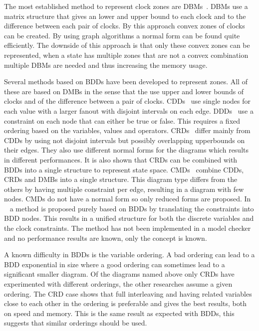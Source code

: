 \documentclass[11pt]{article}
\begin{document}
The most established method to represent clock zones are DBMs~\cite{dbmorig, bengtsson2002clocks}. DBMs use a matrix structure that gives an lower and upper bound to each clock and to the difference between each pair of clocks. By this approach convex zones of clocks can be created. By using graph algorithms a normal form can be found quite efficiently. The downside of this approach is that only these convex zones can be represented, when a state has multiple zones that are not a convex combination multiple DBMs are needed and thus increasing the memory usage. 

Several methods based on BDDs have been developed to represent zones. All of these are based on DMBs in the sense that the use upper and lower bounds of clocks and of the difference between a pair of clocks. CDDs~\cite{BRICS19491} use single nodes for each value with a larger fanout with disjoint intervals on each edge. DDDs~\cite{ddds} use a constraint on each node that can either be true or false. This requires a fixed ordering based on the variables, values and operators. CRDs~\cite{crds} differ mainly from CDDs by using not disjoint intervals but possibly overlapping upperbounds on their edges. They also use different normal forms for the diagrams which results in different performances. It is also shown that CRDs can be combined with BDDs into a single structure to represent state space. CMDs~\cite{5702245} combine CDDs, CRDs and DMBs into a single structure. This diagram type differs from the others by having multiple constraint per edge, resulting in a diagram with few nodes. CMDs do not have a normal form so only reduced forms are proposed. In ~\cite{7098276, 7184781} a method is proposed purely based on BDDs by translating the constraints into BDD nodes. This results in a unified structure for both the discrete variables and the clock constraints. The method has not been implemented in a model checker and no performance results are known, only the concept is known. 

A known difficulty in BDDs is the variable ordering. A bad ordering can lead to a BDD exponential in size where a good ordering can sometimes lead to a significant smaller diagram. Of the diagrams named above only CRDs have experimented with different orderings, the other researches assume a given ordering. The CRD case shows that full interleaving and having related variables close to each other in the ordering is preferable and gives the best results, both on speed and memory. This is the same result as expected with BDDs, this suggests that similar orderings should be used.
\end{document}
